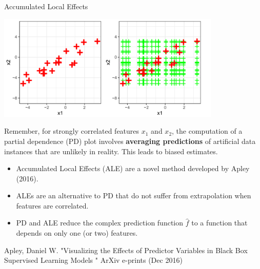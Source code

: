 







\begin{vbframe}{Accumulated Local Effects}


\begin{center}
\includegraphics[width=0.8\textwidth]{figure_man/accu01.png}
\end{center}

Remember, for strongly correlated features $x_1$ and $x_2$, the computation of a partial dependence (PD) plot involves \textbf{averaging predictions} of artificial data instances that are unlikely in reality.
This leads to biased estimates.

\framebreak

\begin{itemize}
  \item Accumulated Local Effects (ALE) are a novel method developed by Apley (2016).
  \item ALEs are an alternative to PD that do not suffer from extrapolation when features are correlated.
  \item PD and ALE reduce the complex prediction function $\hat{f}$ to a function that depends on only one (or two) features.
\end{itemize}
\vspace{1cm}
{\tiny{Apley, Daniel W. "Visualizing the Effects of Predictor Variables in Black Box Supervised Learning Models " ArXiv e-prints (Dec 2016)}\par}
\end{vbframe}

